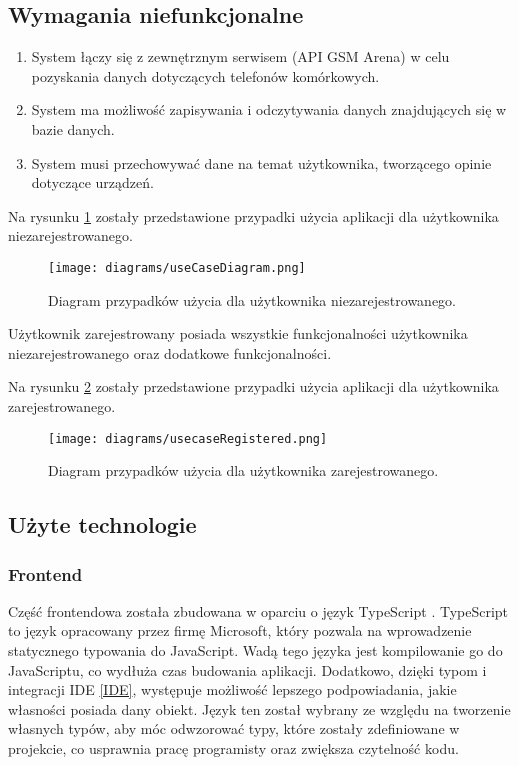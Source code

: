 \subsection{Wymagania niefunkcjonalne}
\begin{enumerate}
    \item System łączy się z zewnętrznym serwisem (API GSM Arena) w celu pozyskania danych dotyczących telefonów komórkowych.
    \item System ma możliwość zapisywania i odczytywania danych znajdujących się w bazie danych.
    \item System musi przechowywać dane na temat użytkownika, tworzącego opinie dotyczące urządzeń.
\end{enumerate}

\newpage
Na rysunku \ref{use_case_1} zostały przedstawione przypadki użycia aplikacji dla użytkownika niezarejestrowanego.
\begin{figure}[H]
    \centering
    \texttt{[image: diagrams/useCaseDiagram.png]}
    \caption{Diagram przypadków użycia dla użytkownika niezarejestrowanego.}
    \label{use_case_1}
\end{figure}
Użytkownik zarejestrowany posiada wszystkie funkcjonalności użytkownika niezarejestrowanego oraz dodatkowe funkcjonalności.

Na rysunku \ref{use_case_2} zostały przedstawione przypadki użycia aplikacji dla użytkownika zarejestrowanego.
\begin{figure}[H]
    \centering
    \texttt{[image: diagrams/usecaseRegistered.png]}
    \caption{Diagram przypadków użycia dla użytkownika zarejestrowanego.}
    \label{use_case_2}
\end{figure}

\subsection{Użyte technologie}
\subsubsection{Frontend}
Część frontendowa została zbudowana w oparciu o język TypeScript \cite{TypeScript}. TypeScript to język opracowany przez firmę Microsoft, który pozwala na wprowadzenie statycznego typowania do JavaScript. Wadą tego języka jest kompilowanie go do JavaScriptu, co wydłuża czas budowania aplikacji. Dodatkowo, dzięki typom i integracji IDE \ref{IDE}, występuje możliwość lepszego podpowiadania, jakie własności posiada dany obiekt.
Język ten został wybrany ze względu na tworzenie własnych typów, aby móc odwzorować typy, które zostały zdefiniowane w projekcie, co usprawnia pracę programisty oraz zwiększa czytelność kodu. 

